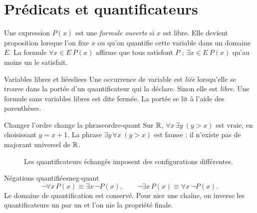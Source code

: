 \section{Prédicats et quantificateurs}
Une expression $P(x)$ est une \emph{formule ouverte} si $x$ est libre. Elle devient proposition lorsque l'on fixe $x$ ou qu'on quantifie cette variable dans un domaine $E$. La formule $\forall x\in E\ P(x)$ affirme que tous satisfont $P$ ; $\exists x\in E\ P(x)$ qu'au moins un le satisfait.
\begin{definition}{Variables libres et liées}{liees}
Une occurrence de variable est \emph{liée} lorsqu'elle se trouve dans la portée d'un quantificateur qui la déclare. Sinon elle est \emph{libre}. Une formule sans variables libres est dite fermée. La portée se lit à l'aide des parenthèses.
\end{definition}
\begin{exemple}{Changer l'ordre change la phrase}{ordre-quant}
Sur $\mathbb R$, $\forall x\,\exists y\ (y>x)$ est vraie, en choisissant $y=x+1$. La phrase $\exists y\,\forall x\ (y>x)$ est fausse : il n'existe pas de majorant universel de $\mathbb R$.
\end{exemple}
\begin{figure}[htbp]\centering
{}
\caption{Les quantificateurs échangés imposent des configurations différentes.}
\end{figure}
\begin{proposition}{Négations quantifiées}{neg-quant}
\[
\neg\forall x\,P(x)\equiv\exists x\,\neg P(x),\qquad
\neg\exists x\,P(x)\equiv\forall x\,\neg P(x).
\]
Le domaine de quantification est conservé. Pour nier une chaîne, on inverse les quantificateurs un par un et l'on nie la propriété finale.
\end{proposition}
